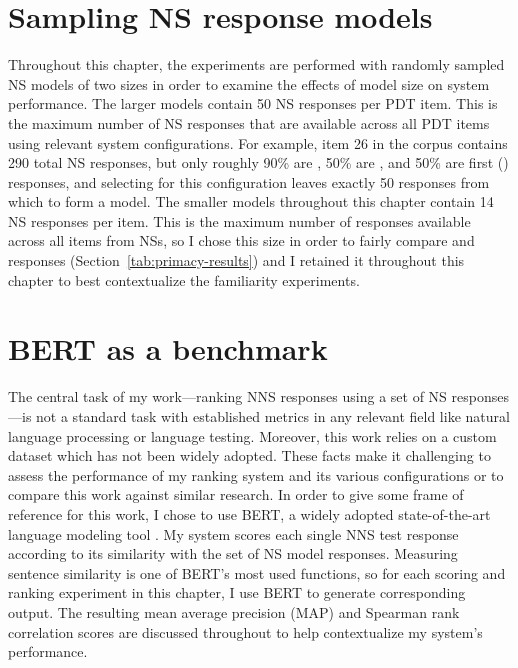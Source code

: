 \section{Sampling NS response models}
\label{sec:sampling}

Throughout this chapter, the experiments are performed with randomly sampled NS models of two sizes in order to examine the effects of model size on system performance. The larger models contain 50 NS responses per PDT item. This is the maximum number of NS responses that are available across all PDT items using relevant system configurations. For example, item 26 in the corpus contains 290 total NS responses, but only roughly 90\% are , 50\% are , and 50\% are first () responses, and selecting for this configuration leaves exactly 50 responses from which to form a model. The smaller models throughout this chapter contain 14 NS responses per item. This is the maximum number of responses available across all items from  NSs, so I chose this size in order to fairly compare  and  responses (Section~\ref{tab:primacy-results}) and I retained it throughout this chapter to best contextualize the familiarity experiments.

\section{BERT as a benchmark}
\label{sec:bert-benchmark}
The central task of my work---ranking NNS responses using a set of NS responses---is not a standard task with established metrics in any relevant field like natural language processing or language testing. Moreover, this work relies on a custom dataset which has not been widely adopted. These facts make it challenging to assess the performance of my ranking system and its various configurations or to compare this work against similar research. In order to give some frame of reference for this work, I chose to use BERT, a widely adopted state-of-the-art language modeling tool \cite{BertDevlin2018}. My system scores each single NNS test response according to its similarity with the set of NS model responses. Measuring sentence similarity is one of BERT's most used functions, so for each scoring and ranking experiment in this chapter, I use BERT to generate corresponding output. The resulting mean average precision (MAP) and Spearman rank correlation scores are discussed throughout to help contextualize my system's performance.


